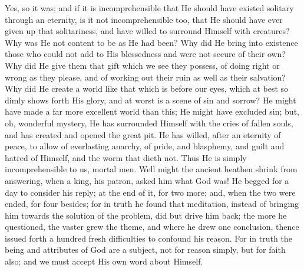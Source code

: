 Yes, so it was; and if it is incomprehensible that He should have
existed solitary through an eternity, is it not incomprehensible too,
that He should have ever given up that solitariness, and have willed
to surround Himself with creatures? Why was He not content to be as He
had been? Why did He bring into existence those who could not add to
His blessedness and were not secure of their own? Why did He give them
that gift which we see they possess, of doing right or wrong as they
please, and of working out their ruin as well as their salvation? Why
did He create a world like that which is before our eyes, which at
best so dimly shows forth His glory, and at worst is a scene of sin
and sorrow? He might have made a far more excellent world than this;
He might have excluded sin; but, oh, wonderful mystery, He has
surrounded Himself with the cries of fallen souls, and has created and
opened the great pit. He has willed, after an eternity of peace, to
allow of everlasting anarchy, of pride, and blasphemy, and guilt and
hatred of Himself, and the worm that dieth not. Thus He is simply
incomprehensible to us, mortal men. Well might the ancient heathen
shrink from answering, when a king, his patron, asked him what God
was! He begged for a day to consider his reply; at the end of it, for
two more; and, when the two were ended, for four besides; for in truth
he found that meditation, instead of bringing him towards the solution
of the problem, did but drive him back; the more he questioned, the
vaster grew the theme, and where he drew one conclusion, thence issued
forth a hundred fresh difficulties to confound his reason. For in
truth the being and attributes of God are a subject, not for reason
simply, but for faith also; and we must accept His own word about
Himself.

